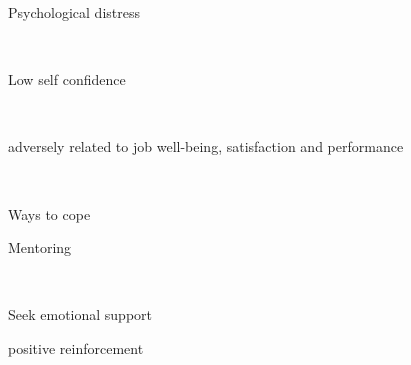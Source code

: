 \documentclass[aspectratio=169]{beamer}
\begin{document}
\begin{frame}
  \begin{center}
    \Huge Psychological distress

    \\ \small \cite{hh15}
  \end{center}
\end{frame}

\begin{frame}
  \begin{center}
    \Huge Low self confidence

    \\ \small \cite{hh15}
  \end{center}
\end{frame}

\begin{frame}
  \begin{center}
    \Huge adversely related to job well-being, satisfaction and performance

    \\ \small \cite{hh15}
  \end{center}
\end{frame}

\begin{frame}
  \begin{center}
    \Huge Ways to cope
  \end{center}
\end{frame}

\begin{frame}
  \begin{center}
    \Huge Mentoring

    \\ \small \cite{hh15}
  \end{center}
\end{frame}

\begin{frame}
  \begin{center}
    \Huge Seek emotional support
    \\ \small \cite{hh15}
  \end{center}
\end{frame}

\begin{frame}
  \begin{center}
    \Huge positive reinforcement
    \\ \small \cite{hh15}
  \end{center}
\end{frame}
\end{document}
